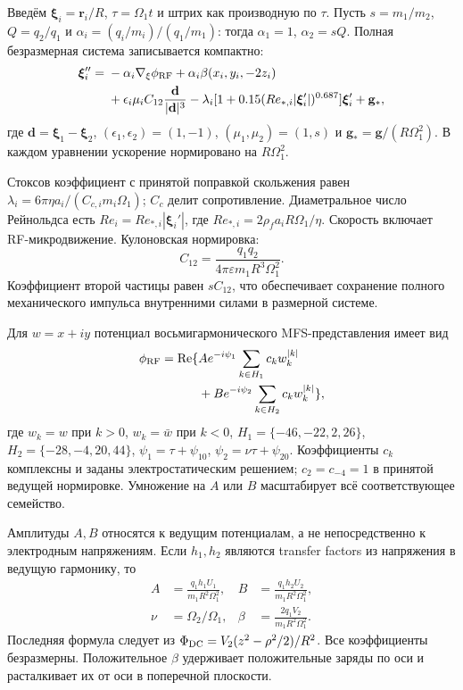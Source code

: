 \documentclass[aip,cha,reprint,a4paper,amsmath,amssymb]{revtex4-2}
\begin{document}
Введём $\boldsymbol\xi_i=\mathbf r_i/R$, $\tau=\Omega_1t$ и штрих как производную по $\tau$. Пусть $s=m_1/m_2$, $Q=q_2/q_1$ и $\alpha_i=(q_i/m_i)/(q_1/m_1)$: тогда $\alpha_1=1$, $\alpha_2=sQ$. Полная безразмерная система записывается компактно:
\begin{equation}\begin{split}
\boldsymbol\xi_i''={}&-\alpha_i\nabla_{\xi}\phi_{\rm RF}
+\alpha_i\beta(x_i,y_i,-2z_i)\\
&+\epsilon_i\mu_i C_{12}\frac{\mathbf d}{|\mathbf d|^3}
-\lambda_i[1+0.15(Re_{*,i}|\boldsymbol\xi_i'|)^{0.687}]
\boldsymbol\xi_i'+\mathbf g_*,
\end{split}\end{equation}
где $\mathbf d=\boldsymbol\xi_1-\boldsymbol\xi_2$, $(\epsilon_1,\epsilon_2)=(1,-1)$, $(\mu_1,\mu_2)=(1,s)$ и $\mathbf g_*=\mathbf g/(R\Omega_1^2)$. В каждом уравнении ускорение нормировано на $R\Omega_1^2$.

Стоксов коэффициент с принятой поправкой скольжения равен $\lambda_i=6\pi\eta a_i/(C_{c,i}m_i\Omega_1)$; $C_c$ делит сопротивление. Диаметральное число Рейнольдса есть $Re_i=Re_{*,i}|\boldsymbol\xi_i'|$, где $Re_{*,i}=2\rho_f a_iR\Omega_1/\eta$. Скорость включает RF-микродвижение. Кулоновская нормировка:
\begin{equation}
 C_{12}=\frac{q_1q_2}{4\pi\varepsilon m_1R^3\Omega_1^2}.
\end{equation}
Коэффициент второй частицы равен $sC_{12}$, что обеспечивает сохранение полного механического импульса внутренними силами в размерной системе.

Для $w=x+iy$ потенциал восьмигармонического MFS-представления имеет вид
\begin{equation}\begin{split}
\phi_{\rm RF}={\rm Re}\{&A e^{-i\psi_1}\sum_{k\in H_1}c_kw_k^{|k|}\\
 &+B e^{-i\psi_2}\sum_{k\in H_2}c_kw_k^{|k|}\},
\end{split}\end{equation}
где $w_k=w$ при $k>0$, $w_k=\bar w$ при $k<0$,
$H_1=\{-46,-22,2,26\}$, $H_2=\{-28,-4,20,44\}$,
$\psi_1=\tau+\psi_{10}$, $\psi_2=\nu\tau+\psi_{20}$.
Коэффициенты $c_k$ комплексны и заданы электростатическим решением; $c_2=c_{-4}=1$ в принятой ведущей нормировке. Умножение на $A$ или $B$ масштабирует всё соответствующее семейство.

Амплитуды $A,B$ относятся к ведущим потенциалам, а не непосредственно к электродным напряжениям. Если $h_1,h_2$ являются transfer factors из напряжения в ведущую гармонику, то
\begin{equation}\begin{aligned}
 A&=\frac{q_1h_1U_1}{m_1R^2\Omega_1^2},&
 B&=\frac{q_1h_2U_2}{m_1R^2\Omega_1^2},\\
 \nu&=\Omega_2/\Omega_1,&
 \beta&=\frac{2q_1V_2}{m_1R^2\Omega_1^2}.
\end{aligned}\end{equation}
Последняя формула следует из $\Phi_{\rm DC}=V_2(z^2-\rho^2/2)/R^2$. Все коэффициенты безразмерны. Положительное $\beta$ удерживает положительные заряды по оси и расталкивает их от оси в поперечной плоскости.
\end{document}
